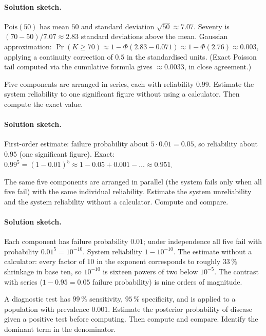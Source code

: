 \paragraph{Solution sketch.}
$\mathrm{Pois}(50)$ has mean $50$ and standard deviation
$\sqrt{50} \approx 7.07$. Seventy is $(70 - 50)/7.07 \approx 2.83$
standard deviations above the mean. Gaussian approximation:
$\Pr(K \geq 70) \approx 1 - \Phi(2.83 - 0.071) \approx 1 -
\Phi(2.76) \approx 0.003$, applying a continuity correction of
$0.5$ in the standardised units. (Exact Poisson tail computed via
the cumulative formula gives $\approx 0.0033$, in close agreement.)

\begin{exercise}
Five components are arranged in series, each with reliability
$0.99$. Estimate the system reliability to one significant figure
without using a calculator. Then compute the exact value.
\end{exercise}

\paragraph{Solution sketch.}
First-order estimate: failure probability about $5 \cdot 0.01 =
0.05$, so reliability about $0.95$ (one significant figure). Exact:
$0.99^{5} = (1 - 0.01)^{5} \approx 1 - 0.05 + 0.001 - \ldots
\approx 0.951$.

\begin{exercise}
The same five components are arranged in parallel (the system
fails only when all five fail) with the same individual
reliability. Estimate the system unreliability and the system
reliability without a calculator. Compute and compare.
\end{exercise}

\paragraph{Solution sketch.}
Each component has failure probability $0.01$; under independence
all five fail with probability $0.01^{5} = 10^{-10}$. System
reliability $1 - 10^{-10}$. The estimate without a calculator: every
factor of $10$ in the exponent corresponds to roughly $33\,\%$
shrinkage in base ten, so $10^{-10}$ is sixteen powers of two below
$10^{-5}$. The contrast with series ($1 - 0.95 = 0.05$ failure
probability) is nine orders of magnitude.

\begin{exercise}
A diagnostic test has $99\,\%$ sensitivity, $95\,\%$ specificity,
and is applied to a population with prevalence $0.001$. Estimate
the posterior probability of disease given a positive test before
computing. Then compute and compare. Identify the dominant term in
the denominator.
\end{exercise}

